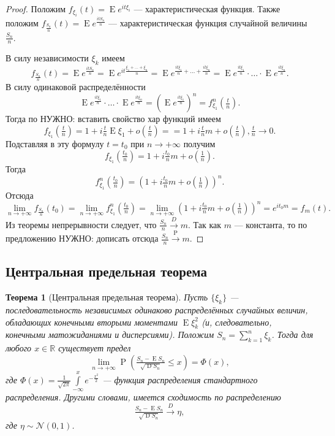 \documentclass[12pt]{article}
\newtheorem{theorem}{Теорема}
\numberwithin{theorem}{section}
\theoremstyle{definition}
\newcommand{\RR}{\mathbb{R}}
\newcommand{\prob}{\operatorname{P}}
\newcommand{\expect}{\operatorname{E}}
\newcommand{\disp}{\operatorname{D}}
\newcommand{\TODO}[1]{\textcolor{todocolor}{НУЖНО: #1}}
\begin{document}
	\begin{proof}
		Положим $ f_{\xi_i}(t) = \expect e^{it\xi_i} $ --- характеристическая функция.
		Также положим $ f_{\tfrac{S_n}{n}}(t) = \expect e^{\tfrac{itS_n}{n}} $ --- характеристическая функция
		случайной величины $ \tfrac{S_n}{n} $.
		
		В силу независимости $ \xi_k $ имеем
		$$ f_{\tfrac{S_n}{n}}(t) = \expect e^{\tfrac{itS_n}{n}} = \expect e^{it\tfrac{\xi_1 + \ldots + \xi_n}{n}}
		= \expect e^{\tfrac{it\xi_1}{n} + \ldots + \tfrac{it\xi_n}{n}}
		= \expect e^{\tfrac{it\xi_1}{n}} \cdot \ldots \cdot \expect e^{\tfrac{it\xi_n}{n}}. $$
		В силу одинаковой распределённости
		$$ \expect e^{\tfrac{it\xi_1}{n}} \cdot \ldots \cdot \expect e^{\tfrac{it\xi_n}{n}}
		= (\expect e^{\tfrac{it\xi_1}{n}})^n = f_{\xi_1}^n(\tfrac{t}{n}). $$
		Тогда по \TODO{вставить свойство хар функций}
		имеем
		$$ f_{\xi_1}(\tfrac{t}{n}) 
		= 1 + i\tfrac{t}{n}\expect\xi_1 + o(\tfrac{t}{n})
		= = 1 + i\tfrac{t}{n}m + o(\tfrac{t}{n}), \tfrac{t}{n} \to 0. $$
		Подставляя в эту формулу $ t = t_0 $ при $ n \to +\infty $ получим 
		$$ f_{\xi_1}(\tfrac{t_0}{n}) = 1 + i\tfrac{t_0}{n}m + o(\tfrac{1}{n}). $$
		Тогда
		$$ f_{\xi_1}^n(\tfrac{t_0}{n}) = \left(1 + i\tfrac{t_0}{n}m + o(\tfrac{1}{n})\right)^n. $$
		Отсюда
		$$ \lim\limits_{n \to +\infty} f_{\tfrac{S_n}{n}}(t_0)
		= \lim\limits_{n \to +\infty} f_{\xi_1}^n(\tfrac{t_0}{n})
		= \lim\limits_{n \to +\infty} \left(1 + i\tfrac{t_0}{n}m + o(\tfrac{1}{n})\right)^n
		= e^{it_0m} = f_{m}(t). $$
		Из теоремы непрерывности следует, что $ \tfrac{S_n}{n} \overset{D}{\to} m $.
		Так как $ m $ --- константа, то по предложению \TODO{дописать} отсюда $ \tfrac{S_n}{n} \overset{\prob}{\to} m $.
	\end{proof}
	
	\subsection{Центральная предельная теорема}
	
	\begin{theorem}[Центральная предельная теорема] \label{central limit theorem}
		Пусть $ \{\xi_k\} $ --- последовательность независимых одинаково распределённых случайных величин,
		обладающих конечными вторыми моментами $ \expect\xi_k^2 $ (и, следовательно, конечными матожиданиями и дисперсиями).
		Положим $ S_n = \sum\limits_{k = 1}^{n} \xi_k $.
		Тогда для любого $ x \in \RR $ существует предел
		$$ \lim\limits_{n \to +\infty} \prob(\tfrac{S_n - \expect S_n}{\sqrt{\disp S_n}} \leqslant x) = \Phi(x), $$
		где $ \Phi(x) = \tfrac{1}{\sqrt{2\pi}}\int\limits_{-\infty}^{x} e^{-\tfrac{x^2}{2}} $
		--- функция распределения стандартного распределения.
		Другими словами, имеется сходимость по распределению
		$$ \tfrac{S_n - \expect S_n}{\sqrt{\disp S_n}} \overset{D}{\to} \eta, $$
		где $ \eta \sim \mathcal{N}(0, 1) $.
	\end{theorem}
	
\end{document}
